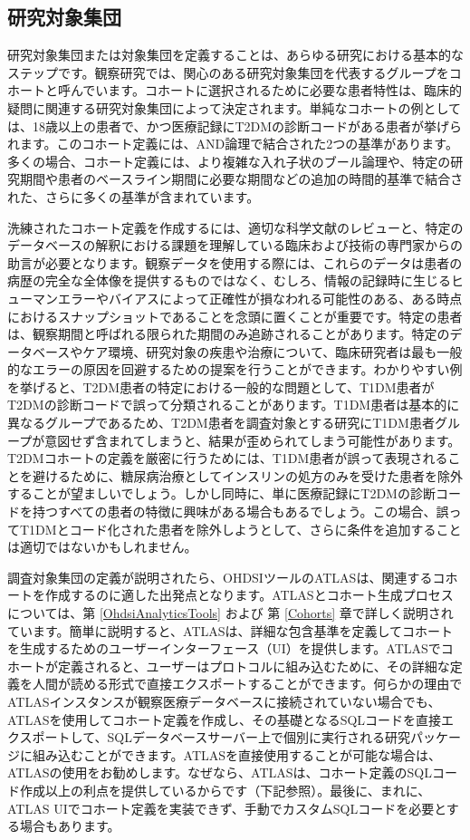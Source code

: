 \documentclass[
  11pt]{book}
\theoremstyle{definition}
\theoremstyle{definition}
\theoremstyle{definition}
\theoremstyle{definition}
\theoremstyle{remark}
\begin{document}
\subsection{研究対象集団}\label{ux7814ux7a76ux5bfeux8c61ux96c6ux56e3-1}

研究対象集団または対象集団を定義することは、あらゆる研究における基本的なステップです。観察研究では、関心のある研究対象集団を代表するグループをコホートと呼んでいます。コホートに選択されるために必要な患者特性は、臨床的疑問に関連する研究対象集団によって決定されます。単純なコホートの例としては、18歳以上の患者で、かつ医療記録にT2DMの診断コードがある患者が挙げられます。このコホート定義には、AND論理で結合された2つの基準があります。多くの場合、コホート定義には、より複雑な入れ子状のブール論理や、特定の研究期間や患者のベースライン期間に必要な期間などの追加の時間的基準で結合された、さらに多くの基準が含まれています。

洗練されたコホート定義を作成するには、適切な科学文献のレビューと、特定のデータベースの解釈における課題を理解している臨床および技術の専門家からの助言が必要となります。観察データを使用する際には、これらのデータは患者の病歴の完全な全体像を提供するものではなく、むしろ、情報の記録時に生じるヒューマンエラーやバイアスによって正確性が損なわれる可能性のある、ある時点におけるスナップショットであることを念頭に置くことが重要です。特定の患者は、観察期間と呼ばれる限られた期間のみ追跡されることがあります。特定のデータベースやケア環境、研究対象の疾患や治療について、臨床研究者は最も一般的なエラーの原因を回避するための提案を行うことができます。わかりやすい例を挙げると、T2DM患者の特定における一般的な問題として、T1DM患者がT2DMの診断コードで誤って分類されることがあります。T1DM患者は基本的に異なるグループであるため、T2DM患者を調査対象とする研究にT1DM患者グループが意図せず含まれてしまうと、結果が歪められてしまう可能性があります。T2DMコホートの定義を厳密に行うためには、T1DM患者が誤って表現されることを避けるために、糖尿病治療としてインスリンの処方のみを受けた患者を除外することが望ましいでしょう。しかし同時に、単に医療記録にT2DMの診断コードを持つすべての患者の特徴に興味がある場合もあるでしょう。この場合、誤ってT1DMとコード化された患者を除外しようとして、さらに条件を追加することは適切ではないかもしれません。

調査対象集団の定義が説明されたら、OHDSIツールのATLASは、関連するコホートを作成するのに適した出発点となります。ATLASとコホート生成プロセスについては、第 \ref{OhdsiAnalyticsTools} および 第 \ref{Cohorts} 章で詳しく説明されています。簡単に説明すると、ATLASは、詳細な包含基準を定義してコホートを生成するためのユーザーインターフェース（UI）を提供します。ATLASでコホートが定義されると、ユーザーはプロトコルに組み込むために、その詳細な定義を人間が読める形式で直接エクスポートすることができます。何らかの理由でATLASインスタンスが観察医療データベースに接続されていない場合でも、ATLASを使用してコホート定義を作成し、その基礎となるSQLコードを直接エクスポートして、SQLデータベースサーバー上で個別に実行される研究パッケージに組み込むことができます。ATLASを直接使用することが可能な場合は、ATLASの使用をお勧めします。なぜなら、ATLASは、コホート定義のSQLコード作成以上の利点を提供しているからです（下記参照）。最後に、まれに、ATLAS UIでコホート定義を実装できず、手動でカスタムSQLコードを必要とする場合もあります。
\end{document}
